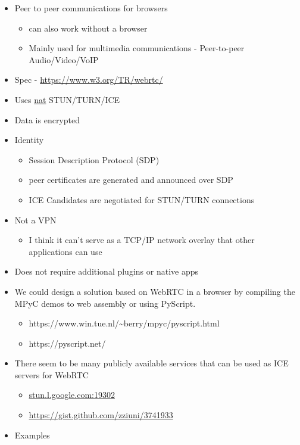 \begin{itemize}
\tightlist
\item
  Peer to peer communications for browsers

  \begin{itemize}
  \tightlist
  \item
    can also work without a browser
  \item
    Mainly used for multimedia communications - Peer-to-peer
    Audio/Video/VoIP
  \end{itemize}
\item
  Spec -
  \href{https://www.w3.org/TR/webrtc/\#persistent-information-exposed-by-webrtc}{https://www.w3.org/TR/webrtc/}
\item
  Uses \href{notes/02021-internet-protocol.md}{nat} STUN/TURN/ICE
\item
  Data is encrypted
\item
  Identity

  \begin{itemize}
  \tightlist
  \item
    Session Description Protocol (SDP)
  \item
    peer certificates are generated and announced over SDP
  \item
    ICE Candidates are negotiated for STUN/TURN connections
  \end{itemize}
\item
  Not a VPN

  \begin{itemize}
  \tightlist
  \item
    I think it can't serve as a TCP/IP network overlay that other
    applications can use
  \end{itemize}
\item
  Does not require additional plugins or native apps
\item
  We could design a solution based on WebRTC in a browser by compiling
  the MPyC demos to web assembly or using PyScript.

  \begin{itemize}
  \tightlist
  \item
    https://www.win.tue.nl/\textasciitilde berry/mpyc/pyscript.html
  \item
    https://pyscript.net/
  \end{itemize}
\item
  There seem to be many publicly available services that can be used as
  ICE servers for WebRTC

  \begin{itemize}
  \tightlist
  \item
    \href{http://stun.l.google.com:19302/}{stun.l.google.com:19302}
  \item
    \url{https://gist.github.com/zziuni/3741933}
  \end{itemize}
\item
  Examples


\end{itemize}

